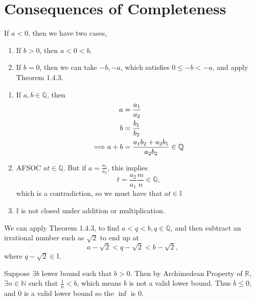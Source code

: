 \section{Consequences of Completeness}
\setcounter{exercise}{0}

\begin{exercise}
	If $a<0$, then we have two cases,
	\begin{enumerate}
		\item If $b > 0$, then $a < 0 < b$.
		\item If $b = 0$, then we can take $-b, -a$, which satisfies $0 \leq -b < -a$, and apply Theorem 1.4.3.
	\end{enumerate}
\end{exercise}

\begin{exercise}
\begin{enumerate}[label=(\alph*)]
	\item If $a, b \in \mathbb{Q}$, then 
	\begin{align*}
		a &= \frac{a_1}{a_2} \\
		b &= \frac{b_1}{b_2} \\
		\Longrightarrow a + b &= \frac{a_1b_2 + a_2b_1}{a_2b_2} \in \mathbb{Q}
	\end{align*}
	\item AFSOC $at \in \mathbb{Q}$. But if $a = \frac{a_1}{a_2}$, this implies
	\begin{equation*}
		t = \frac{a_2}{a_1}\frac{m}{n} \in \mathbb{Q},
	\end{equation*}
	which is a contradiction, so we must have that $at \in\mathbb{I}$
	\item $\mathbb{I}$ is not closed under addition or multiplication.
\end{enumerate}
\end{exercise}

\begin{exercise}
	We can apply Theorem 1.4.3, to find $a < q < b, q \in \mathbb{Q}$, and then subtract an irrational number such as $\sqrt{2}$ to end up at 
	\begin{equation}
		a - \sqrt{2} < q - \sqrt{2} < b - \sqrt{2},
	\end{equation}
	where $q- \sqrt{2} \in \mathbb{I}$.
\end{exercise}

\begin{exercise}
	Suppose $\exists b$ lower bound such that $b > 0$. Then by Archimedean Property of $\mathbb{R}$, $\exists n \in \mathbb{N}$ such that $\frac{1}{n} < b$, which means $b$ is not a valid lower bound. Thus $b \leq 0$, and 0 is a valid lower bound so the $\inf$ is 0.
\end{exercise}


